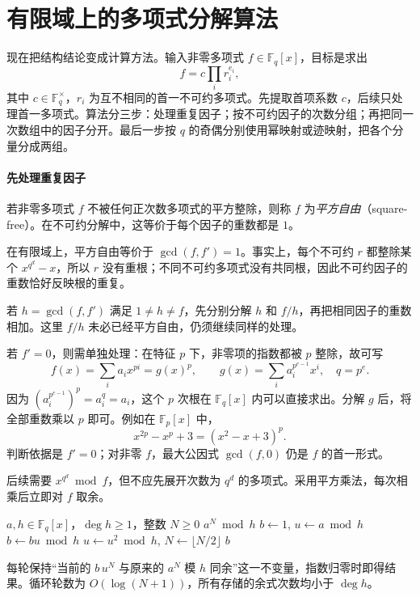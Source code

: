 \documentclass[lang=cn,a4paper,fontset=none,zihao=false,10pt,openany,twoside]{beautybook}
\numberwithin{algorithm}{chapter}
\begin{document}
\section{有限域上的多项式分解算法}\label{sec:finite-factor-route}
现在把结构结论变成计算方法。输入非零多项式 $f\in\mathbb F_q[x]$，目标是求出
\[
 f=c\prod_i r_i^{e_i},
\]
其中 $c\in\mathbb F_q^\times$，$r_i$ 为互不相同的首一不可约多项式。先提取首项系数 $c$，后续只处理首一多项式。算法分三步：处理重复因子；按不可约因子的次数分组；再把同一次数组中的因子分开。最后一步按 $q$ 的奇偶分别使用幂映射或迹映射，把各个分量分成两组。

\paragraph{先处理重复因子}
\begin{definition}[平方自由多项式]
若非零多项式 $f$ 不被任何正次数多项式的平方整除，则称 $f$ 为\emph{平方自由}（square-free）。在不可约分解中，这等价于每个因子的重数都是 $1$。
\end{definition}
在有限域上，平方自由等价于 $\gcd(f,f')=1$。事实上，每个不可约 $r$ 都整除某个 $x^{q^d}-x$，所以 $r$ 没有重根；不同不可约多项式没有共同根，因此不可约因子的重数恰好反映根的重复。

若 $h=\gcd(f,f')$ 满足 $1\ne h\ne f$，先分别分解 $h$ 和 $f/h$，再把相同因子的重数相加。这里 $f/h$ 未必已经平方自由，仍须继续同样的处理。

若 $f'=0$，则需单独处理：在特征 $p$ 下，非零项的指数都被 $p$ 整除，故可写
\[
 f(x)=\sum_i a_i x^{pi}=g(x)^p,\qquad
 g(x)=\sum_i a_i^{p^{e-1}}x^i,\quad q=p^e.
\]
因为 $(a_i^{p^{e-1}})^p=a_i^q=a_i$，这个 $p$ 次根在 $\mathbb F_q[x]$ 内可以直接求出。分解 $g$ 后，将全部重数乘以 $p$ 即可。例如在 $\mathbb F_p[x]$ 中，
\[
 x^{2p}-x^p+3=(x^2-x+3)^p.
\]
判断依据是 $f'=0$；对非零 $f$，最大公因式 $\gcd(f,0)$ 仍是 $f$ 的首一形式。

后续需要 $x^{q^d}\bmod f$，但不应先展开次数为 $q^d$ 的多项式。采用平方乘法，每次相乘后立即对 $f$ 取余。
\begin{algorithm}[htbp]
\caption{多项式模快速幂}\label{alg:poly-powmod}
\begin{algorithmic}[1]
\Require $a,h\in\mathbb F_q[x]$，$\deg h\ge1$，整数 $N\ge0$
\Ensure $a^N\bmod h$
 \State $b\gets1$, $u\gets a\bmod h$
   \State $b\gets bu\bmod h$
  \EndIf
  \State $u\gets u^2\bmod h$, $N\gets\lfloor N/2\rfloor$
 \EndWhile
 \State \Return $b$
\EndFunction
\end{algorithmic}
\end{algorithm}
每轮保持“当前的 $b\,u^N$ 与原来的 $a^N$ 模 $h$ 同余”这一不变量，指数归零时即得结果。循环轮数为 $O(\log(N+1))$，所有存储的余式次数均小于 $\deg h$。
\end{document}
